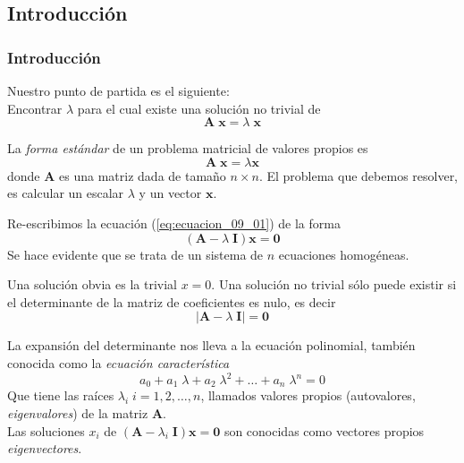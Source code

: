 \subsection{Introducción}
\begin{frame}
\frametitle{Introducción}
Nuestro punto de partida es el siguiente:
\\
\bigskip
Encontrar $\lambda$ para el cual existe una solución no trivial de
\[ \mathbf{A \; x} = \lambda \; \mathbf{x} \]
\end{frame}
\begin{frame}
La \emph{forma estándar} de un problema matricial de valores propios es
\begin{equation}
\mathbf{A \; x} = \lambda \mathbf{x}
\label{eq:ecuacion_09_01}
\end{equation}
donde $\mathbf{A}$ es una matriz dada de tamaño $n \times n$. El problema que debemos resolver, es calcular un escalar $\lambda$ y un vector $\mathbf{x}$.
\end{frame}
\begin{frame}
Re-escribimos la ecuación (\ref{eq:ecuacion_09_01}) de la forma
\begin{equation}
( \mathbf{A} - \lambda \; \mathbf{I} ) \mathbf{x} = \mathbf{0}
\label{eq:ecuacion_09_02}
\end{equation}
Se hace evidente que se trata de un sistema de $n$ ecuaciones homogéneas.
\end{frame}
\begin{frame}
Una solución obvia es la trivial $x = 0$. Una solución no trivial sólo puede existir si el determinante de la matriz de coeficientes es nulo, es decir
\begin{equation}
\vert \mathbf{A} - \lambda \; \mathbf{I} \vert = \mathbf{0}
\label{eq:ecuacion_09_03}
\end{equation}
\end{frame}
\begin{frame}
La expansión del determinante nos lleva a la ecuación polinomial, también conocida como la \emph{ecuación característica}
\[ a_{0} + a_{1} \; \lambda + a_{2} \; \lambda^{2} + \ldots + a_{n} \; \lambda^{n} = 0 \]
Que tiene las raíces $\lambda_{i} \; i = 1, 2, \ldots,  n$, llamados valores propios (autovalores, \emph{eigenvalores}) de la matriz $\mathbf{A}$.
\\
\medskip
Las soluciones $x_{i}$ de $(\mathbf{A}- \lambda_{i} \; \mathbf{I}) \mathbf{x} = \mathbf{0}$ son conocidas como vectores propios \emph{eigenvectores}.
\end{frame}
